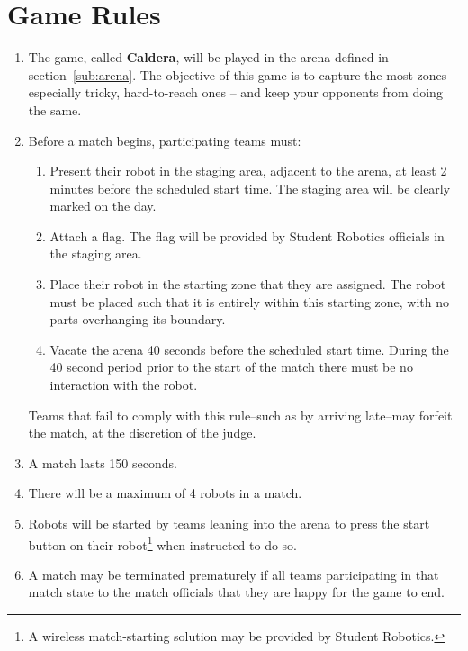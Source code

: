 \section {Game Rules}
\label{game-rules}

\begin{enumerate}
\item The game, called \textbf{Caldera}, will be played in the arena defined in section~\ref{sub:arena}.  The objective of this game is to capture the most zones -- especially tricky, hard-to-reach ones -- and keep your opponents from doing the same.

\item Before a match begins, participating teams must:
\begin {enumerate}
  \item Present their robot in the staging area, adjacent to the arena, at least 2 minutes before the scheduled start time.
        The staging area will be clearly marked on the day.

  \item Attach a flag. The flag will be provided by Student Robotics officials in the staging area.

  \item Place their robot in the starting zone that they are assigned.
        The robot must be placed such that it is entirely within this starting zone, with no parts overhanging its boundary.

  \item Vacate the arena 40 seconds before the scheduled start time.
        During the 40 second period prior to the start of the match there must be no interaction with the robot.
\end{enumerate}
  Teams that fail to comply with this rule--such as by arriving late--may forfeit the match, at the discretion of the judge.

\item A match lasts 150 seconds.

\item There will be a maximum of 4 robots in a match.

\item Robots will be started by teams leaning into the arena to press the start button on their robot\footnote{A wireless match-starting solution may be provided by Student Robotics.} when instructed to do so.

\item A match may be terminated prematurely if all teams participating in that match state to the match officials that they are happy for the game to end.


\end{enumerate}
